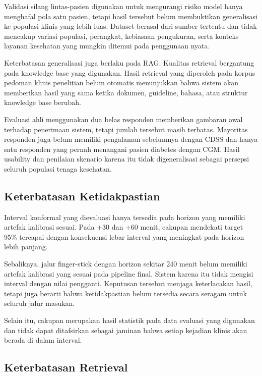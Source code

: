 Validasi silang lintas-pasien digunakan untuk mengurangi risiko model hanya menghafal pola satu pasien, tetapi hasil tersebut belum membuktikan
generalisasi ke populasi klinis yang lebih luas. Dataset berasal dari sumber tertentu dan tidak mencakup variasi populasi, perangkat, kebiasaan pengukuran,
serta konteks layanan kesehatan yang mungkin ditemui pada penggunaan nyata.

Keterbatasan generalisasi juga berlaku pada RAG. Kualitas retrieval bergantung pada knowledge base yang digunakan. Hasil retrieval yang diperoleh pada
korpus pedoman klinis penelitian belum otomatis menunjukkan bahwa sistem akan memberikan hasil yang sama ketika dokumen, guideline, bahasa, atau struktur
knowledge base berubah.

Evaluasi ahli menggunakan dua belas responden memberikan gambaran awal terhadap penerimaan sistem, tetapi jumlah tersebut masih terbatas. Mayoritas
responden juga belum memiliki pengalaman sebelumnya dengan CDSS dan hanya satu responden yang pernah menangani pasien diabetes dengan CGM. Hasil usability
dan penilaian skenario karena itu tidak digeneralisasi sebagai persepsi seluruh populasi tenaga kesehatan.

\subsection{Keterbatasan Ketidakpastian}
\label{subsec:bab6-keterbatasan-uncertainty}

Interval konformal yang dievaluasi hanya tersedia pada horizon yang memiliki artefak kalibrasi sesuai. Pada +30 dan +60 menit, cakupan mendekati target
95\% tercapai dengan konsekuensi lebar interval yang meningkat pada horizon lebih panjang.

Sebaliknya, jalur finger-stick dengan horizon sekitar 240 menit belum memiliki artefak kalibrasi yang sesuai pada pipeline final. Sistem karena itu tidak
mengisi interval dengan nilai pengganti. Keputusan tersebut menjaga keterlacakan hasil, tetapi juga berarti bahwa ketidakpastian belum tersedia secara
seragam untuk seluruh jalur masukan.

Selain itu, cakupan merupakan hasil statistik pada data evaluasi yang digunakan dan tidak dapat ditafsirkan sebagai jaminan bahwa setiap kejadian klinis
akan berada di dalam interval.

\subsection{Keterbatasan Retrieval}
\label{subsec:bab6-keterbatasan-retrieval}

